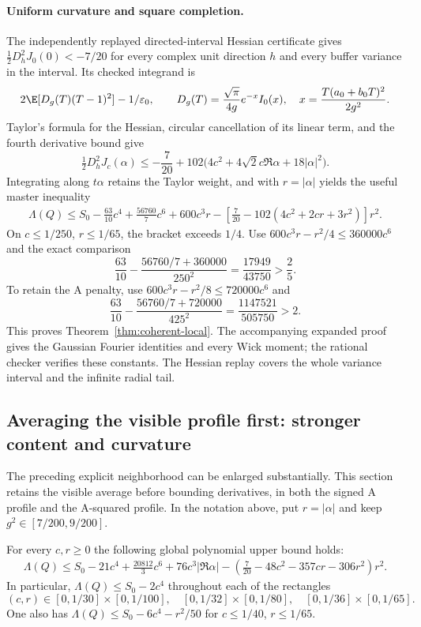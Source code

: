\paragraph{Uniform curvature and square completion.}
The independently replayed directed-interval Hessian certificate gives
$\tfrac12D_h^2J_0(0)<-7/20$ for every complex unit direction $h$ and
every buffer variance in the interval. Its checked integrand is
\[
 2\E[D_g(T)(T-1)^2]-1/\varepsilon_0,\qquad
 D_g(T)=\frac{\sqrt\pi}{4g}e^{-x}I_0(x),\quad
 x=\frac{T(a_0+b_0T)^2}{2g^2}.
\]
Taylor's formula for the Hessian, circular cancellation of its linear
term, and the fourth derivative bound give
\[
 \tfrac12D_h^2J_c(\alpha)
 \le-\frac7{20}
       +102\bigl(4c^2+4\sqrt2c\Re\alpha+18|\alpha|^2\bigr).
\]
Integrating along $t\alpha$ retains the Taylor weight, and with
$r=|\alpha|$ yields the useful master inequality
\begin{align*}
 \Lambda(Q)\le S_0-\frac{63}{10}c^4+\frac{56760}{7}c^6
 +600c^3r
 -\left[\frac7{20}-102(4c^2+2cr+3r^2)\right]r^2.
\end{align*}
On $c\le1/250$, $r\le1/65$, the bracket exceeds $1/4$.
Use $600c^3r-r^2/4\le360000c^6$ and the exact comparison
\[
 \frac{63}{10}
 -\frac{56760/7+360000}{250^2}
 =\frac{17949}{43750}>\frac25.
\]
To retain the A penalty, use
$600c^3r-r^2/8\le720000c^6$ and
\[
 \frac{63}{10}
 -\frac{56760/7+720000}{425^2}
 =\frac{1147521}{505750}>2.
\]
This proves Theorem~\ref{thm:coherent-local}. The accompanying expanded
proof gives the Gaussian Fourier identities and every Wick moment;
the rational checker verifies these constants. The Hessian replay
covers the whole variance interval and the infinite radial tail.

\subsection{Averaging the visible profile first: stronger content and curvature}
The preceding explicit neighborhood can be enlarged substantially. This
section retains the visible average before bounding derivatives, in both
the signed A profile and the A-squared profile. In the notation above,
put $r=|\alpha|$ and keep $g^2\in[7/200,9/200]$.

\begin{theorem}
\label{thm:coherent-sharp}
For every $c,r\ge0$ the following global polynomial upper bound holds:
\begin{align*}
 \Lambda(Q)\le S_0-21c^4+\frac{20812}{3}c^6
 +76c^3|\Re\alpha|
 -\left(\frac7{20}-48c^2-357cr-306r^2\right)r^2.
\end{align*}
In particular, $\Lambda(Q)\le S_0-2c^4$ throughout each of the rectangles
\[
 (c,r)\in[0,1/30]\times[0,1/100],\quad
 [0,1/32]\times[0,1/80],\quad
 [0,1/36]\times[0,1/65].
\]
One also has $\Lambda(Q)\le S_0-6c^4-r^2/50$ for
$c\le1/40$, $r\le1/65$.
\end{theorem}

